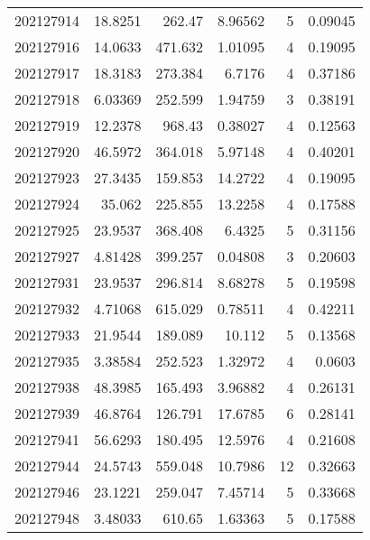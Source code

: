 \begin{tabular}{rrrrrr}
 202127914 &         18.8251  &      262.47   &            8.96562 &           5 & 0.09045 \\
 202127916 &         14.0633  &      471.632  &            1.01095 &           4 & 0.19095 \\
 202127917 &         18.3183  &      273.384  &            6.7176  &           4 & 0.37186 \\
 202127918 &          6.03369 &      252.599  &            1.94759 &           3 & 0.38191 \\
 202127919 &         12.2378  &      968.43   &            0.38027 &           4 & 0.12563 \\
 202127920 &         46.5972  &      364.018  &            5.97148 &           4 & 0.40201 \\
 202127923 &         27.3435  &      159.853  &           14.2722  &           4 & 0.19095 \\
 202127924 &         35.062   &      225.855  &           13.2258  &           4 & 0.17588 \\
 202127925 &         23.9537  &      368.408  &            6.4325  &           5 & 0.31156 \\
 202127927 &          4.81428 &      399.257  &            0.04808 &           3 & 0.20603 \\
 202127931 &         23.9537  &      296.814  &            8.68278 &           5 & 0.19598 \\
 202127932 &          4.71068 &      615.029  &            0.78511 &           4 & 0.42211 \\
 202127933 &         21.9544  &      189.089  &           10.112   &           5 & 0.13568 \\
 202127935 &          3.38584 &      252.523  &            1.32972 &           4 & 0.0603  \\
 202127938 &         48.3985  &      165.493  &            3.96882 &           4 & 0.26131 \\
 202127939 &         46.8764  &      126.791  &           17.6785  &           6 & 0.28141 \\
 202127941 &         56.6293  &      180.495  &           12.5976  &           4 & 0.21608 \\
 202127944 &         24.5743  &      559.048  &           10.7986  &          12 & 0.32663 \\
 202127946 &         23.1221  &      259.047  &            7.45714 &           5 & 0.33668 \\
 202127948 &          3.48033 &      610.65   &            1.63363 &           5 & 0.17588 \\

\end{tabular}
